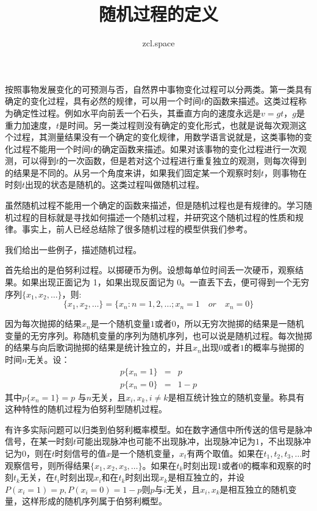 \documentclass[10pt,a4paper,UTF8]{article}
\author{zcl.space}
\date{}
\title{随机过程的定义}
\begin{document}
\maketitle
按照事物发展变化的可预测与否，自然界中事物变化过程可以分两类。第一类具有确定的变化过程，具有必然的规律，可以用一个时间\(t\)的函数来描述。这类过程称为确定性过程。例如水平向前丢一个石头，其垂直方向的速度永远是\(v=gt\)，\(g\)是重力加速度，\(t\)是时间。另一类过程则没有确定的变化形式，也就是说每次观测这个过程，其测量结果没有一个确定的变化规律，用数学语言说就是，这类事物的变化过程不能用一个时间\(t\)的确定函数来描述。如果对该事物的变化过程进行一次观测，可以得到\(t\)的一次函数，但是若对这个过程进行重复独立的观测，则每次得到的结果是不同的。从另一个角度来讲，如果我们固定某一个观察时刻\(t\)，则事物在时刻\(t\)出现的状态是随机的。这类过程叫做随机过程。

虽然随机过程不能用一个确定的函数来描述，但是随机过程也是有规律的。学习随机过程的目标就是寻找如何描述一个随机过程，并研究这个随机过程的性质和规律。事实上，前人已经总结除了很多随机过程的模型供我们参考。

我们给出一些例子，描述随机过程。

\begin{instance}
首先给出的是伯努利过程。以掷硬币为例。设想每单位时间丢一次硬币，观察结果。如果出现正面记为 1，如果出现反面记为 0。一直丢下去，便可得到一个无穷序列\(\{x_{1},x_{2},\ldots \}\)，则:
\begin{equation}
\label{eq:1}
\{x_{1},x_{2},\ldots \} = \{x_{n}:n=1,2,\ldots ;x_{n}=1 \quad or \quad x_{n} = 0\}
\end{equation}

因为每次抛掷的结果\(x_{n}\)是一个随机变量\(1\)或者\(0\)，所以无穷次抛掷的结果是一随机变量的无穷序列。称随机变量的序列为随机序列，也可以说是随机过程。每次抛掷的结果与向后歌词抛掷的结果是统计独立的，并且\(x_{n}\)出现\(0\)或者\(1\)的概率与抛掷的时间\(n\)无关。设：
\begin{eqnarray}
\label{eq:2}
p\{x_{n} = 1\}&=& p \\
p\{x_{n} = 0\}&=&1- p
\end{eqnarray}
其中\(p\{x_{n} = 1\} = p\) 与\(n\)无关，且\(x_{i},x_{k},i\neq k\)是相互统计独立的随机变量。称具有这种特性的随机过程为伯努利型随机过程。

有许多实际问题可以归类到伯努利概率模型。如在数字通信中所传送的信号是脉冲信号，在某一时刻\(t\)可能出现脉冲也可能不出现脉冲，出现脉冲记为\(1\)，不出现脉冲记为\(0\)，则在\(t\)时刻信号的值\(x\)是一个随机变量，\(x_{t}\)有两个取值。如果在\(t_{1},t_{2},t_{3},\ldots\)时观察信号，则所得结果\(\{x_{1},x_{2},x_{3},\ldots \}\)。如果在\(t_{k}\)时刻出现\(1\)或者\(0\)的概率和观察的时刻\(t_{k}\)无关，在\(t_{i}\)时刻出现\(x_{i}\)和在\(t_{k}\)时刻出现\(x_{k}\)是相互独立的，并设\(P(x_{i} =1) = p,P(x_{i} = 0) = 1-p\)则\(p\)与\(i\)无关，且\(x_{i},x_{k}\)是相互独立的随机变量，这样形成的随机序列属于伯努利概型。
\end{instance}
\end{document}
